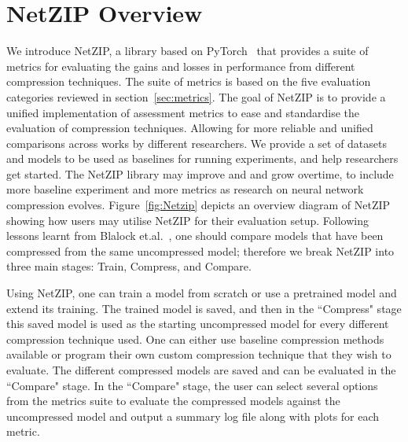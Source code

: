 \section{NetZIP Overview} \label{sec:NetZIP_overview}
%
We introduce NetZIP, a library based on PyTorch~\cite{paszke2017automatic} that provides a suite of metrics for evaluating the gains and losses in performance from different compression techniques.
%
The suite of metrics is based on the five evaluation categories reviewed in  section~\ref{sec:metrics}.
%
The goal of NetZIP is to provide a unified implementation of assessment metrics to ease and standardise the evaluation of compression techniques. Allowing for more reliable and unified comparisons across works by different researchers.
%
We provide a set of datasets and models to be used as baselines for running experiments, and help researchers get started.  
%
The NetZIP library may improve and and grow overtime, to include more baseline experiment and more metrics as research on neural network compression evolves. 
%
Figure~\ref{fig:Netzip} depicts an overview diagram of NetZIP showing how users may utilise NetZIP for their evaluation setup. 
%
Following lessons learnt from Blalock et.al.~\cite{Blalock2020}, one should compare models that have been compressed from the same uncompressed model; therefore we break NetZIP into three main stages: Train, Compress, and Compare. 

Using NetZIP, one can train a model from scratch or use a pretrained model and extend its training. 
%
The trained model is saved, and then in the ``Compress" stage this saved model is used as the starting uncompressed model for every different compression technique used. 
%
One can either use baseline compression methods available or program their own custom compression technique that they wish to evaluate. The different compressed models are saved and can be evaluated in the ``Compare" stage. 
%
In the ``Compare" stage, the user can select several options from the metrics suite to evaluate the compressed models against the uncompressed model and output a summary log file along with plots for each metric.%
%


